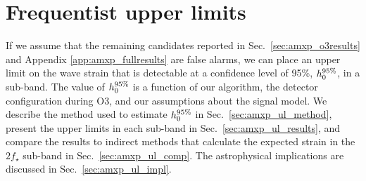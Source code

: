 \section{Frequentist upper limits \label{sec:amxp_ul}}
If we assume that the remaining candidates reported in Sec.~\ref{sec:amxp_o3results} and Appendix \ref{app:amxp_fullresults} are false alarms, we can place an upper limit on the wave strain that is detectable at a confidence level of 95\%, $h_0^{95\%}$, in a sub-band. The value of $h_0^{95\%}$ is a function of our algorithm, the detector configuration during O3, and our assumptions about the signal model. We describe the method used to estimate $h_0^{95\%}$ in Sec.~\ref{sec:amxp_ul_method}, present the upper limits in each sub-band in Sec.~\ref{sec:amxp_ul_results}, and compare the results to indirect methods that calculate the expected strain in the $2f_\star$ sub-band in Sec.~\ref{sec:amxp_ul_comp}. The astrophysical implications are discussed in Sec.~\ref{sec:amxp_ul_impl}.

